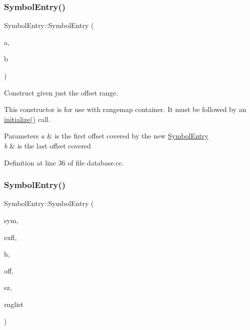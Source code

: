 \subsubsection{\texorpdfstring{SymbolEntry()}{SymbolEntry()}\hspace{0.1cm}{\footnotesize\ttfamily [1/2]}}
{\footnotesize\ttfamily Symbol\+Entry\+::\+Symbol\+Entry (\begin{DoxyParamCaption}\item[{\mbox{\hyperlink{types_8h_a2db313c5d32a12b01d26ac9b3bca178f}{uintb}}}]{a,  }\item[{\mbox{\hyperlink{types_8h_a2db313c5d32a12b01d26ac9b3bca178f}{uintb}}}]{b }\end{DoxyParamCaption})}



Construct given just the offset range. 

This constructor is for use with rangemap container. It must be followed by an \mbox{\hyperlink{class_symbol_entry_a46693677a8ea05b33472f8a1714efbb7}{initialize()}} call. 
\begin{DoxyParams}{Parameters}
{\em a} & is the first offset covered by the new \mbox{\hyperlink{class_symbol_entry}{Symbol\+Entry}} \\
\hline
{\em b} & is the last offset covered \\
\hline
\end{DoxyParams}


Definition at line 36 of file database.\+cc.

\mbox{\label{class_symbol_entry_a1233239187212ed427a718aae75e524c}} 
\subsubsection{\texorpdfstring{SymbolEntry()}{SymbolEntry()}\hspace{0.1cm}{\footnotesize\ttfamily [2/2]}}
{\footnotesize\ttfamily Symbol\+Entry\+::\+Symbol\+Entry (\begin{DoxyParamCaption}\item[{\mbox{\hyperlink{class_symbol}{Symbol}} $\ast$}]{sym,  }\item[{uint4}]{exfl,  }\item[{uint8}]{h,  }\item[{int4}]{off,  }\item[{int4}]{sz,  }\item[{const \mbox{\hyperlink{class_range_list}{Range\+List}} \&}]{rnglist }\end{DoxyParamCaption})}



